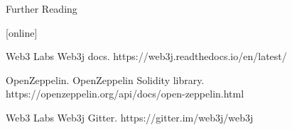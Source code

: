 \documentclass{beamer}
\begin{document}
\begin{frame}{Further Reading}
    
  \begin{thebibliography}{1}
  [online]
  
		Web3 Labs
	    \newblock Web3j docs.
	    \newblock https://web3j.readthedocs.io/en/latest/
	    
		OpenZeppelin.
	    \newblock OpenZeppelin Solidity library.
	    \newblock https://openzeppelin.org/api/docs/open-zeppelin.html
	    
	    Web3 Labs
	    \newblock Web3j Gitter.
	    \newblock https://gitter.im/web3j/web3j
  
  \end{thebibliography}
\end{frame}
\end{document}
